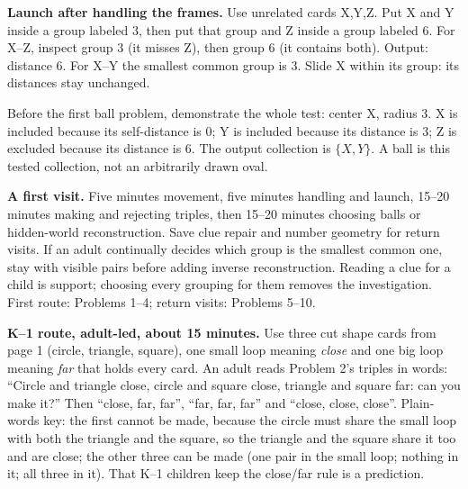 \documentclass[11pt]{article}
\begin{document}
\textbf{Launch after handling the frames.} Use unrelated cards X,Y,Z. Put X and Y inside a group labeled 3, then put that group and Z inside a group labeled 6. For X--Z, inspect group 3 (it misses Z), then group 6 (it contains both). Output: distance 6. For X--Y the smallest common group is 3. Slide X within its group: its distances stay unchanged.
\begin{center}
\end{center}
Before the first ball problem, demonstrate the whole test: center X, radius 3. X is included because its self-distance is 0; Y is included because its distance is 3; Z is excluded because its distance is 6. The output collection is $\{X,Y\}$. A ball is this tested collection, not an arbitrarily drawn oval.

\textbf{A first visit.} Five minutes movement, five minutes handling and launch, 15--20 minutes making and rejecting triples, then 15--20 minutes choosing balls or hidden-world reconstruction. Save clue repair and number geometry for return visits. If an adult continually decides which group is the smallest common one, stay with visible pairs before adding inverse reconstruction. Reading a clue for a child is support; choosing every grouping for them removes the investigation. First route: Problems 1--4; return visits: Problems 5--10.

\textbf{K--1 route, adult-led, about 15 minutes.} Use three cut shape cards from page 1 (circle, triangle, square), one small loop meaning \emph{close} and one big loop meaning \emph{far} that holds every card. An adult reads Problem 2's triples in words: ``Circle and triangle close, circle and square close, triangle and square far: can you make it?'' Then ``close, far, far'', ``far, far, far'' and ``close, close, close''. Plain-words key: the first cannot be made, because the circle must share the small loop with both the triangle and the square, so the triangle and the square share it too and are close; the other three can be made (one pair in the small loop; nothing in it; all three in it). That K--1 children keep the close/far rule is a prediction.


\end{document}
